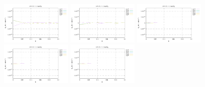 \noindent
\includegraphics[width=3.5cm]{python_codes/fieldstone_152/RESULTS/exp1/err_32_m2}
\includegraphics[width=3.5cm]{python_codes/fieldstone_152/RESULTS/exp1/err_32_m3}
\includegraphics[width=3.5cm]{python_codes/fieldstone_152/RESULTS/exp1/err_32_m4}
\includegraphics[width=3.5cm]{python_codes/fieldstone_152/RESULTS/exp1/err_32_m5}
\includegraphics[width=3.5cm]{python_codes/fieldstone_152/RESULTS/exp1/err_32_m6}

